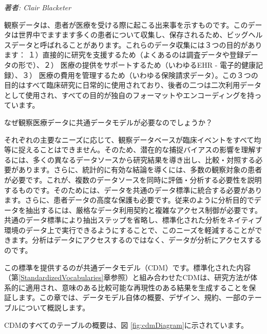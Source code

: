 \documentclass[
  11pt]{book}
\theoremstyle{definition}
\theoremstyle{definition}
\theoremstyle{definition}
\theoremstyle{definition}
\theoremstyle{remark}
\begin{document}
\emph{著者: Clair Blacketer}

観察データは、患者が医療を受ける際に起こる出来事を示すものです。このデータは世界中でますます多くの患者について収集し、保存されるため、ビッグヘルスデータと呼ばれることがあります。これらのデータ収集には３つの目的があります： １）直接的に研究を支援するため（よくあるのは調査データや登録データの形で）、２） 医療の提供をサポートするため（いわゆるEHR - 電子的健康記録）、３） 医療の費用を管理するため（いわゆる保険請求データ）。この３つの目的はすべて臨床研究に日常的に使用されており、後者の二つは二次利用データとして使用され、すべての目的が独自のフォーマットやエンコーディングを持っています。   

なぜ観察医療データに共通データモデルが必要なのでしょうか？

それぞれの主要なニーズに応じて、観察データベースが臨床イベントをすべて均等に捉えることはできません。そのため、潜在的な捕捉バイアスの影響を理解するには、多くの異なるデータソースから研究結果を導き出し、比較・対照する必要があります。さらに、統計的に有効な結論を導くには、多数の観察対象の患者が必要です。これが、複数のデータソースを同時に評価・分析する必要性を説明するものです。そのためには、データを共通のデータ標準に統合する必要があります。さらに、患者データの高度な保護も必要です。従来のように分析目的でデータを抽出するには、厳格なデータ利用契約と複雑なアクセス制御が必要です。共通のデータ標準により抽出ステップを省略し、標準化された分析をネイティブ環境のデータ上で実行できるようにすることで、このニーズを軽減することができます。分析はデータにアクセスするのではなく、データが分析にアクセスするのです。

この標準を提供するのが共通データモデル（CDM）です。標準化された内容（第\ref{StandardizedVocabularies}章参照）と組み合わせたCDMは、研究方法が体系的に適用され、意味のある比較可能な再現性のある結果を生成することを保証します。この章では、データモデル自体の概要、デザイン、規約、一部のテーブルについて概説します。

CDMのすべてのテーブルの概要は、図 \ref{fig:cdmDiagram}に示されています。 
\end{document}
